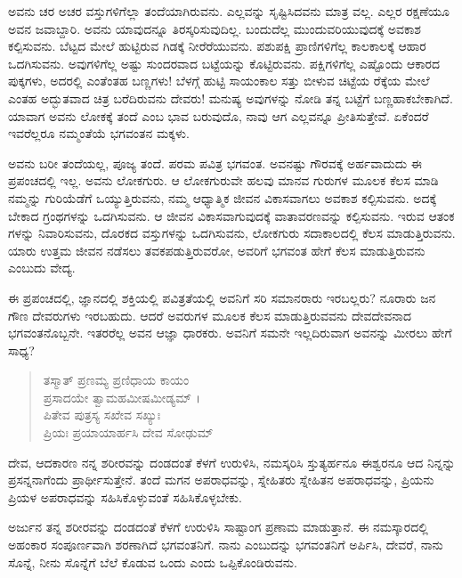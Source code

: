 ಅವನು ಚರ ಅಚರ ವಸ್ತುಗಳಿಗೆಲ್ಲಾ ತಂದೆಯಾಗಿರುವನು. ಎಲ್ಲವನ್ನು ಸೃಷ್ಟಿಸಿದವನು ಮಾತ್ರ ವಲ್ಲ. ಎಲ್ಲರ ರಕ್ಷಣೆಯೂ ಅವನ ಜವಾಬ್ದಾರಿ. ಅವನು ಯಾವುದನ್ನೂ ತಿರಸ್ಕರಿಸುವುದಿಲ್ಲ. ಬಂದುದೆಲ್ಲ ಮುಂದುವರಿಯುವುದಕ್ಕೆ ಅವಕಾಶ ಕಲ್ಪಿಸುವನು. ಬೆಟ್ಟದ ಮೇಲೆ ಹುಟ್ಟಿರುವ ಗಿಡಕ್ಕೆ ನೀರೆರೆಯುವನು. ಪಶುಪಕ್ಷಿ ಪ್ರಾಣಿಗಳಿಗೆಲ್ಲ ಕಾಲಕಾಲಕ್ಕೆ ಆಹಾರ ಒದಗಿಸುವನು. ಅವುಗಳಿಗೆಲ್ಲ ಅಷ್ಟು ಸುಂದರವಾದ ಬಟ್ಟೆಯನ್ನು ಕೊಟ್ಟಿರುವನು. ಪಕ್ಷಿಗಳಿಗೆಲ್ಲ ಎಷ್ಟೊಂದು ಆಕಾರದ ಪುಕ್ಕಗಳು, ಅದರಲ್ಲಿ ಎಂತೆಂತಹ ಬಣ್ಣಗಳು! ಬೆಳಗ್ಗೆ ಹುಟ್ಟಿ ಸಾಯಂಕಾಲ ಸತ್ತು ಬೀಳುವ ಚಿಟ್ಟೆಯ ರೆಕ್ಕೆಯ ಮೇಲೆ ಎಂತಹ ಅದ್ಭುತವಾದ ಚಿತ್ರ ಬರೆದಿರುವನು ದೇವರು! ಮನುಷ್ಯ ಅವುಗಳನ್ನು ನೋಡಿ ತನ್ನ ಬಟ್ಟೆಗೆ ಬಣ್ಣಹಾಕಬೇಕಾಗಿದೆ. ಯಾವಾಗ ಅವನು ಲೋಕಕ್ಕೆ ತಂದೆ ಎಂಬ ಭಾವ ಬರುವುದೊ, ನಾವು ಆಗ ಎಲ್ಲವನ್ನೂ ಪ್ರೀತಿಸುತ್ತೇವೆ. ಏಕೆಂದರೆ ಇವರೆಲ್ಲರೂ ನಮ್ಮಂತೆಯೆ ಭಗವಂತನ ಮಕ್ಕಳು.

ಅವನು ಬರೀ ತಂದೆಯಲ್ಲ, ಪೂಜ್ಯ ತಂದೆ. ಪರಮ ಪವಿತ್ರ ಭಗವಂತ. ಅವನಷ್ಟು ಗೌರವಕ್ಕೆ ಅರ್ಹವಾದುದು ಈ ಪ್ರಪಂಚದಲ್ಲಿ ಇಲ್ಲ. ಅವನು ಲೋಕಗುರು. ಆ ಲೋಕಗುರುವೇ ಹಲವು ಮಾನವ ಗುರುಗಳ ಮೂಲಕ ಕೆಲಸ ಮಾಡಿ ನಮ್ಮನ್ನು ಗುರಿಯೆಡೆಗೆ ಒಯ್ಯುತ್ತಿರುವನು, ನಮ್ಮ ಆಧ್ಯಾತ್ಮಿಕ ಜೀವನ ವಿಕಾಸವಾಗಲು ಅವಕಾಶ ಕಲ್ಪಿಸುವನು. ಅದಕ್ಕೆ ಬೇಕಾದ ಗ್ರಂಥಗಳನ್ನು ಒದಗಿಸುವನು. ಆ ಜೀವನ ವಿಕಾಸವಾಗುವುದಕ್ಕೆ ವಾತಾವರಣವನ್ನು ಕಲ್ಪಿಸುವನು. ಇರುವ ಆತಂಕ ಗಳನ್ನು ನಿವಾರಿಸುವನು, ದೊರಕದ ವಸ್ತುಗಳನ್ನು ಒದಗಿಸುವನು, ಲೋಕಗುರು ಸದಾಕಾಲದಲ್ಲಿ ಕೆಲಸ ಮಾಡುತ್ತಿರುವನು. ಯಾರು ಉತ್ತಮ ಜೀವನ ನಡೆಸಲು ತವಕಪಡುತ್ತಿರುವರೋ, ಅವರಿಗೆ ಭಗವಂತ ಹೇಗೆ ಕೆಲಸ ಮಾಡುತ್ತಿರುವನು ಎಂಬುದು ವೇದ್ಯ.

ಈ ಪ್ರಪಂಚದಲ್ಲಿ, ಜ್ಞಾನದಲ್ಲಿ ಶಕ್ತಿಯಲ್ಲಿ ಪವಿತ್ರತೆಯಲ್ಲಿ ಅವನಿಗೆ ಸರಿ ಸಮಾನರಾರು ಇರಬಲ್ಲರು? ನೂರಾರು ಜನ ಗೌಣ ದೇವರುಗಳು ಇರಬಹುದು. ಆದರೆ ಅವರುಗಳ ಮೂಲಕ ಕೆಲಸ ಮಾಡುತ್ತಿರುವವನು ದೇವದೇವನಾದ ಭಗವಂತನೊಬ್ಬನೇ. ಇತರರೆಲ್ಲ ಅವನ ಆಜ್ಞಾ ಧಾರಕರು. ಅವನಿಗೆ ಸಮನೇ ಇಲ್ಲದಿರುವಾಗ ಅವನನ್ನು ಮೀರಲು ಹೇಗೆ ಸಾಧ್ಯ?

\begin{verse}
ತಸ್ಮಾತ್ ಪ್ರಣಮ್ಯ ಪ್ರಣಿಧಾಯ ಕಾಯಂ \\ ಪ್ರಸಾದಯೇ ತ್ವಾಮಹಮೀಷಮೀಡ್ಯಮ್ ।\\ಪಿತೇವ ಪುತ್ರಸ್ಯ ಸಖೇವ ಸಖ್ಯುಃ \\ ಪ್ರಿಯಃ ಪ್ರಯಾಯಾರ್ಹಸಿ ದೇವ ಸೋಢುಮ್ 
\end{verse}

{\small ದೇವ, ಆದಕಾರಣ ನನ್ನ ಶರೀರವನ್ನು ದಂಡದಂತೆ ಕೆಳಗೆ ಉರುಳಿಸಿ, ನಮಸ್ಕರಿಸಿ ಸ್ತುತ್ಯರ್ಹನೂ ಈಶ್ವರನೂ ಆದ ನಿನ್ನನ್ನು ಪ್ರಸನ್ನನಾಗೆಂದು ಪ್ರಾರ್ಥೀಸುತ್ತೇನೆ. ತಂದೆ ಮಗನ ಅಪರಾಧವನ್ನು, ಸ್ನೇಹಿತರು ಸ್ನೇಹಿತನ ಅಪರಾಧವನ್ನು, ಪ್ರಿಯನು ಪ್ರಿಯಳ ಅಪರಾಧವನ್ನು ಸಹಿಸಿಕೊಳ್ಳುವಂತೆ ಸಹಿಸಿಕೊಳ್ಳಬೇಕು.}

ಅರ್ಜುನ ತನ್ನ ಶರೀರವನ್ನು ದಂಡದಂತೆ ಕೆಳಗೆ ಉರುಳಿಸಿ ಸಾಷ್ಟಾಂಗ ಪ್ರಣಾಮ ಮಾಡುತ್ತಾನೆ. ಈ ನಮಸ್ಕಾರದಲ್ಲಿ ಅಹಂಕಾರ ಸಂಪೂರ್ಣವಾಗಿ ಶರಣಾಗಿದೆ ಭಗವಂತನಿಗೆ. ನಾನು ಎಂಬುದನ್ನು ಭಗವಂತನಿಗೆ ಅರ್ಪಿಸಿ, ದೇವರೆ, ನಾನು ಸೊನ್ನೆ, ನೀನು ಸೊನ್ನೆಗೆ ಬೆಲೆ ಕೊಡುವ ಒಂದು ಎಂದು ಒಪ್ಪಿಕೊಂಡಿರುವನು.

